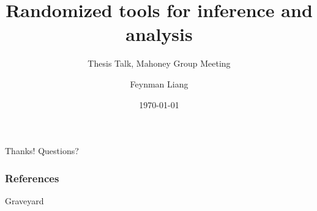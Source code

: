 \documentclass[11pt]{beamer}
\title{Randomized tools for inference and analysis}
\subtitle{Thesis Talk, Mahoney Group Meeting}
\author{Feynman Liang}
\institute{UC Berkeley}
\date{\today}
\begin{document}
\begin{frame}
\titlepage
\end{frame}















\begin{frame}
    \begin{center}
     Thanks! Questions?\par
    \end{center}
\end{frame}


\begin{frame}[allowframebreaks]
        \frametitle{References}
        \printbibliography
\end{frame}

\appendix


\begin{frame}
    \begin{center}
     Graveyard\par
    \end{center}
\end{frame}

\appendsubframes
\end{document}
